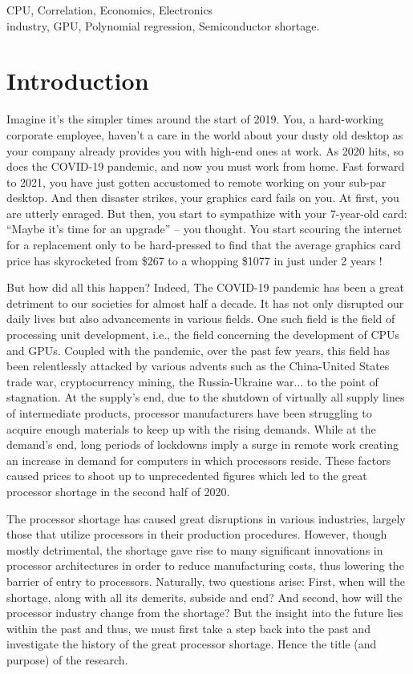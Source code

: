 \documentclass[conference]{IEEEtran}
\begin{document}
\begin{IEEEkeywords}
	CPU, Correlation, Economics, Electronics\\
	industry, GPU, Polynomial regression, Semiconductor shortage.
\end{IEEEkeywords}

\section{Introduction}
Imagine it's the simpler times around the start of 2019. You, a
hard-working corporate employee, haven't a care in the world about your
dusty old desktop as your company already provides you with high-end ones
at work. As 2020 hits, so does the COVID-19 pandemic, and now you must
work from home. Fast forward to 2021, you have just gotten accustomed to
remote working on your sub-par desktop. And then disaster strikes, your
graphics card fails on you. At first, you are utterly enraged. But then,
you start to sympathize with your 7-year-old card: ``Maybe it's time for
an upgrade'' -- you thought. You start scouring the internet for a
replacement only to be hard-pressed to find that the average graphics
card price has skyrocketed from \$267 to a whopping \$1077 in just under 2
years \cite{Dave:2022}!

But how did all this happen? Indeed, The COVID-19 pandemic has been a
great detriment to our societies for almost half a decade. It has not
only disrupted our daily lives but also advancements in various
fields. One such field is the field of processing unit development, i.e.,
the field concerning the development of CPUs and GPUs. Coupled with the
pandemic, over the past few years, this field has been relentlessly attacked
by various advents such as the China-United States trade war, cryptocurrency
mining, the Russia-Ukraine war...\cite{Wikipedia:2023} to the point of
stagnation. At the supply's
end, due to the shutdown of virtually all supply lines of intermediate
products, processor manufacturers have been struggling to acquire enough
materials to keep up with the rising demands. While at the demand's end,
long periods of lockdowns imply a surge in remote work creating an
increase in demand for computers in which processors reside. These
factors caused prices to shoot up to unprecedented figures which led to
the great processor shortage in the second half of 2020.

The processor shortage has caused great disruptions in various
industries, largely those that utilize processors in their production
procedures. However, though mostly detrimental, the shortage gave rise to
many significant innovations in processor architectures in order to
reduce manufacturing costs, thus lowering the barrier of entry to
processors. Naturally, two questions arise: First, when will the
shortage, along with all its demerits, subside and end? And second, how
will the processor industry change from the shortage? But the insight
into the future lies within the past and thus, we must first take a step
back into the past and investigate the history of the great
processor shortage. Hence the title (and purpose) of the research.
\end{document}
